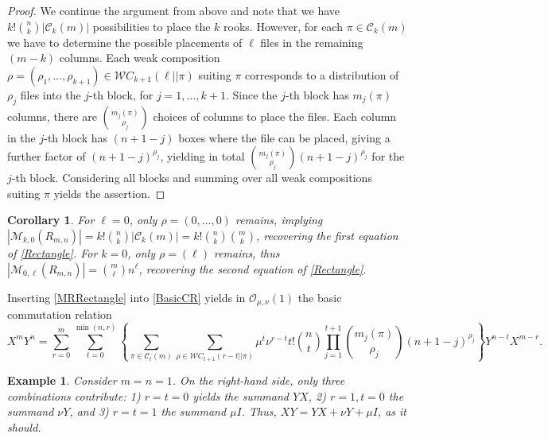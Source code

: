 \documentclass[10pt]{amsart}
\newtheorem{corollary}[theorem]{Corollary}
\newtheorem{example}[theorem]{Example}%
\begin{document}
\begin{proof}
We continue the argument from above and note that we have $ k! \binom{n}{k} | {\mathcal C}_k(m) |$ possibilities to place the $k$ rooks. However, for each $\pi \in {\mathcal C}_k(m) $ we have to determine the possible placements of $\ell$ files in the remaining $(m-k)$ columns. Each weak composition $\rho =(\rho_1,\ldots, \rho_{k+1}) \in {\mathcal WC}_{k+1}(\ell || \pi )$ suiting $\pi$ corresponds to a distribution of $\rho_j$ files into the $j$-th block, for $j=1,\ldots,k+1$. Since the $j$-th block has $m_j(\pi)$ columns, there are $\binom{m_j(\pi)}{\rho_j}$ choices of columns to place the files. Each column in the $j$-th block has $(n+1-j)$ boxes where the file can be placed, giving a further factor of $(n+1-j)^{\rho_j}$, yielding in total $\binom{m_j(\pi)}{\rho_j} (n+1-j)^{\rho_j}$ for the $j$-th block. Considering all blocks and summing over all weak compositions suiting $\pi$ yields the assertion.    
\end{proof}
\begin{corollary}
For $\ell=0$, only $\rho =(0,\ldots,0)$ remains, implying $|{\mathcal M}_{k,0}(R_{m,n})|= k!  \binom{n}{k} |{\mathcal C}_k(m) | =k!  \binom{n}{k} \binom{m}{k}$, recovering the first equation of \eqref{Rectangle}. For $k=0$, only $\rho =(\ell)$ remains, thus $|{\mathcal M}_{0,\ell}(R_{m,n})|= \binom{m}{\ell}n^{\ell}$, recovering  the second equation of \eqref{Rectangle}.
\end{corollary}
Inserting \eqref{MRRectangle} into \eqref{BasicCR} yields in ${\mathcal O}_{\mu,\nu}(1)$ the basic commutation relation
$$
X^mY^n = \sum_{r=0}^{m}\sum_{t=0}^{\min(n, r)}\left\{ \sum_{\pi \in {\mathcal C}_t(m)} \sum_{\rho \in {\mathcal WC}_{t+1}(r-t || \pi)}  \mu^{t} \nu^{r-t} t!  \binom{n}{t} \prod_{j=1}^{t+1} \binom{m_{j}(\pi)}{\rho_{j}}(n+1-j)^{\rho_{j}} \right\} Y^{n-t}X^{m-r}.
$$
\begin{example}
Consider $m=n=1$. On the right-hand side, only three combinations contribute: 1) $r=t=0$ yields the summand $YX$, 2) $r=1,t=0$ the summand $\nu Y$, and 3) $r=t=1$ the summand $\mu I $. Thus, $XY=YX+\nu Y+\mu I$, as it should.
\end{example}
\end{document}
